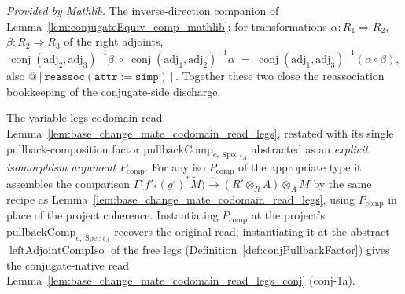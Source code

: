 \begin{lemma}
  \label{lem:conjugateEquiv_symm_comp_mathlib}
  \mathlibok
  \textit{Provided by Mathlib.}
  The inverse-direction companion of Lemma~\ref{lem:conjugateEquiv_comp_mathlib}: for transformations
  \(\alpha : R_1 \Rightarrow R_2\), \(\beta : R_2 \Rightarrow R_3\) of the right adjoints,
  \[
    \operatorname{conj}(\mathrm{adj}_2,\mathrm{adj}_3)^{-1}\beta \;\circ\;
    \operatorname{conj}(\mathrm{adj}_1,\mathrm{adj}_2)^{-1}\alpha
      \;=\; \operatorname{conj}(\mathrm{adj}_1,\mathrm{adj}_3)^{-1}(\alpha \circ \beta) ,
  \]
  also \(\mathtt{@[reassoc (attr := simp)]}\). Together these two close the reassociation bookkeeping of
  the conjugate-side discharge.
\end{lemma}

\begin{definition}

  \label{def:base_change_mate_codomain_read_legs_param}
  The variable-legs codomain read Lemma~\ref{lem:base_change_mate_codomain_read_legs}, restated with
  its single pullback-composition factor \(\mathrm{pullbackComp}_{e,\operatorname{Spec}\iota_A}\)
  abstracted as an \emph{explicit isomorphism argument} \(P_{\mathrm{comp}}\). For any iso
  \(P_{\mathrm{comp}}\) of the appropriate type it assembles the comparison
  \(\Gamma\bigl(f'_*(g')^*\widetilde M\bigr) \xrightarrow{\sim} (R' \otimes_R A) \otimes_A M\) by the
  same recipe as Lemma~\ref{lem:base_change_mate_codomain_read_legs}, using \(P_{\mathrm{comp}}\) in
  place of the project coherence. Instantiating \(P_{\mathrm{comp}}\) at the project's
  \(\mathrm{pullbackComp}_{e,\operatorname{Spec}\iota_A}\) recovers the original read; instantiating it
  at the abstract \(\operatorname{leftAdjointCompIso}\) of the free legs
  (Definition~\ref{def:conjPullbackFactor}) gives the conjugate-native read
  Lemma~\ref{lem:base_change_mate_codomain_read_legs_conj} (conj-1a).
\end{definition}

